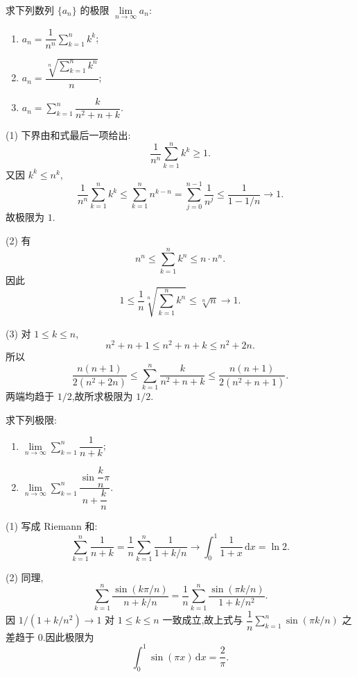 \begin{example}
  求下列数列 $\{a_n\}$ 的极限 $\displaystyle \lim\limits_{n\to\infty}a_n$:
  \begin{enumerate}
    \item $\displaystyle a_n=\dfrac{1}{n^n}\sum\limits_{k=1}^n k^k$;
    \item $\displaystyle a_n=\dfrac{\sqrt[n]{\sum\limits_{k=1}^n k^n}}{n}$;
    \item $\displaystyle a_n=\sum\limits_{k=1}^n\dfrac{k}{n^2+n+k}$.
  \end{enumerate}
\end{example}
\exampleblank

\begin{solution}
  (1) 下界由和式最后一项给出:
  \[
    \dfrac{1}{n^n}\sum\limits_{k=1}^n k^k\geq1.
  \]
  又因 $k^k\leq n^k$,
  \[
    \dfrac{1}{n^n}\sum\limits_{k=1}^n k^k
    \leq\sum\limits_{k=1}^n n^{k-n}
    =\sum\limits_{j=0}^{n-1}\dfrac{1}{n^j}
    \leq\dfrac{1}{1-1/n}\longrightarrow1.
  \]
  故极限为 $1$.

  (2) 有
  \[
    n^n\leq\sum\limits_{k=1}^n k^n\leq n\cdot n^n.
  \]
  因此
  \[
    1\leq\dfrac{1}{n}\sqrt[n]{\sum\limits_{k=1}^n k^n}\leq\sqrt[n]{n}\longrightarrow1.
  \]

  (3) 对 $1\leq k\leq n$,
  \[
    n^2+n+1\leq n^2+n+k\leq n^2+2n.
  \]
  所以
  \[
    \dfrac{n(n+1)}{2(n^2+2n)}
    \leq\sum\limits_{k=1}^n\dfrac{k}{n^2+n+k}
    \leq\dfrac{n(n+1)}{2(n^2+n+1)}.
  \]
  两端均趋于 $1/2$,故所求极限为 $1/2$.
\end{solution}




\begin{example}
  求下列极限:
  \begin{enumerate}
    \item $\displaystyle \lim\limits_{n\to\infty}\sum\limits_{k=1}^n\dfrac{1}{n+k}$;
    \item $\displaystyle \lim\limits_{n\to\infty}\sum\limits_{k=1}^n
            \dfrac{\sin\dfrac{k}{n}\pi}{n+\dfrac{k}{n}}$.
  \end{enumerate}
\end{example}
\exampleblank

\begin{solution}
  (1) 写成 Riemann 和:
  \[
    \sum\limits_{k=1}^n\dfrac{1}{n+k}
    =\dfrac{1}{n}\sum\limits_{k=1}^n\dfrac{1}{1+k/n}
    \longrightarrow\int_0^1\dfrac{1}{1+x}\,\mathrm{d}x=\ln2.
  \]

  (2) 同理,
  \[
    \sum\limits_{k=1}^n\dfrac{\sin(k\pi/n)}{n+k/n}
    =\dfrac{1}{n}\sum\limits_{k=1}^n
    \dfrac{\sin(\pi k/n)}{1+k/n^2}.
  \]
  因 $1/(1+k/n^2)\to1$ 对 $1\leq k\leq n$ 一致成立,故上式与
  $\displaystyle \dfrac{1}{n}\sum\limits_{k=1}^n\sin(\pi k/n)$ 之差趋于 $0$.因此极限为
  \[
    \int_0^1\sin(\pi x)\,\mathrm{d}x=\dfrac{2}{\pi}.
  \]
\end{solution}

